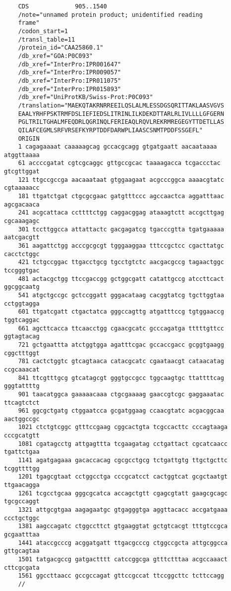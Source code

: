 \documentclass[b5paper,zihao=-4]{ctexbook}
\begin{document}
{\begin{verbatim}
	CDS             905..1540
	/note="unnamed protein product; unidentified reading
	frame"
	/codon_start=1
	/transl_table=11
	/protein_id="CAA25860.1"
	/db_xref="GOA:P0C093"
	/db_xref="InterPro:IPR001647"
	/db_xref="InterPro:IPR009057"
	/db_xref="InterPro:IPR011075"
	/db_xref="InterPro:IPR015893"
	/db_xref="UniProtKB/Swiss-Prot:P0C093"
	/translation="MAEKQTAKRNRREEILQSLALMLESSDGSQRITTAKLAASVGVS
	EAALYRHFPSKTRMFDSLIEFIEDSLITRINLILKDEKDTTARLRLIVLLLLGFGERN
	PGLTRILTGHALMFEQDRLQGRINQLFERIEAQLRQVLREKRMREGEGYTTDETLLAS
	QILAFCEGMLSRFVRSEFKYRPTDDFDARWPLIAASCSNMTPDDFSSGEFL"
	ORIGIN
	1 cagagaaaat caaaaagcag gccacgcagg gtgatgaatt aacaataaaa atggttaaaa
	61 accccgatat cgtcgcaggc gttgccgcac taaaagacca tcgaccctac gtcgttggat
	121 ttgccgccga aacaaataat gtggaagaat acgcccggca aaaacgtatc cgtaaaaacc
	181 ttgatctgat ctgcgcgaac gatgtttccc agccaactca aggatttaac agcgacaaca
	241 acgcattaca ccttttctgg caggacggag ataaagtctt accgcttgag cgcaaagagc
	301 tccttggcca attattactc gacgagatcg tgacccgtta tgatgaaaaa aatcgacgtt
	361 aagattctgg acccgcgcgt tgggaaggaa tttccgctcc cgacttatgc cacctctggc
	421 tctgccggac ttgacctgcg tgcctgtctc aacgacgccg tagaactggc tccgggtgac
	481 actacgctgg ttccgaccgg gctggcgatt catattgccg atccttcact ggcggcaatg
	541 atgctgccgc gctccggatt gggacataag cacggtatcg tgcttggtaa cctggtagga
	601 ttgatcgatt ctgactatca gggccagttg atgatttccg tgtggaaccg tggtcaggac
	661 agcttcacca ttcaacctgg cgaacgcatc gcccagatga tttttgttcc ggtagtacag
	721 gctgaattta atctggtgga agatttcgac gccaccgacc gcggtgaagg cggctttggt
	781 cactctggtc gtcagtaaca catacgcatc cgaataacgt cataacatag ccgcaaacat
	841 ttcgtttgcg gtcatagcgt gggtgccgcc tggcaagtgc ttattttcag gggtattttg
	901 taacatggca gaaaaacaaa ctgcgaaaag gaaccgtcgc gaggaaatac ttcagtctct
	961 ggcgctgatg ctggaatcca gcgatggaag ccaacgtatc acgacggcaa aactggccgc
	1021 ctctgtcggc gtttccgaag cggcactgta tcgccacttc cccagtaaga cccgcatgtt
	1081 cgatagcctg attgagttta tcgaagatag cctgattact cgcatcaacc tgattctgaa
	1141 agatgagaaa gacaccacag cgcgcctgcg tctgattgtg ttgctgcttc tcggttttgg
	1201 tgagcgtaat cctggcctga cccgcatcct cactggtcat gcgctaatgt ttgaacagga
	1261 tcgcctgcaa gggcgcatca accagctgtt cgagcgtatt gaagcgcagc tgcgccaggt
	1321 attgcgtgaa aagagaatgc gtgagggtga aggttacacc accgatgaaa ccctgctggc
	1381 aagccagatc ctggccttct gtgaaggtat gctgtcacgt tttgtccgca gcgaatttaa
	1441 ataccgcccg acggatgatt ttgacgcccg ctggccgcta attgcggcca gttgcagtaa
	1501 tatgacgccg gatgactttt catccggcga gtttctttaa acgccaaact cttcgcgata
	1561 ggccttaacc gccgccagat gttccgccat ttccggcttc tcttccagg
	//
	\end{verbatim}
}
	\printindex
\end{document}
